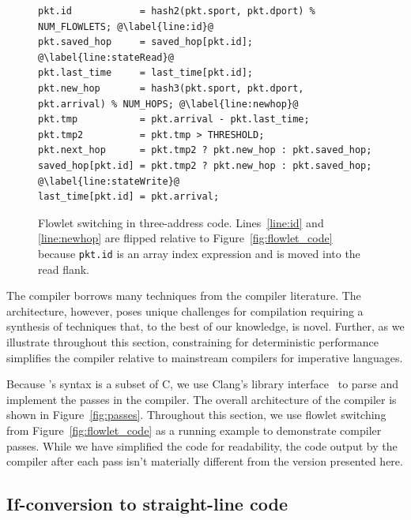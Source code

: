 \begin{figure}[!t]
\begin{minipage}{\textwidth}
\begin{lstlisting}[style=customc]
pkt.id            = hash2(pkt.sport, pkt.dport) % NUM_FLOWLETS; @\label{line:id}@
pkt.saved_hop     = saved_hop[pkt.id]; @\label{line:stateRead}@
pkt.last_time     = last_time[pkt.id];
pkt.new_hop       = hash3(pkt.sport, pkt.dport, pkt.arrival) % NUM_HOPS; @\label{line:newhop}@
pkt.tmp           = pkt.arrival - pkt.last_time;
pkt.tmp2          = pkt.tmp > THRESHOLD;
pkt.next_hop      = pkt.tmp2 ? pkt.new_hop : pkt.saved_hop;
saved_hop[pkt.id] = pkt.tmp2 ? pkt.new_hop : pkt.saved_hop; @\label{line:stateWrite}@
last_time[pkt.id] = pkt.arrival;
\end{lstlisting}
\caption[title2]{Flowlet switching in three-address
code. Lines~\ref{line:id} and \ref{line:newhop} are flipped relative
to Figure~\ref{fig:flowlet_code} because {\tt pkt.id} is an array index expression and is
moved into the read flank.}
\label{fig:three_address}
\end{minipage}
\vspace{-0.5cm}
\end{figure}

The \pktlanguage compiler borrows many techniques from the compiler literature.
The \absmachine architecture, however, poses unique challenges for compilation
requiring a synthesis of techniques that, to the best of our knowledge, is
novel. Further, as we illustrate throughout this section, constraining
\pktlanguage for deterministic performance simplifies the \pktlanguage
compiler relative to mainstream compilers for imperative languages.

Because \pktlanguage's syntax is a subset of C, we use Clang's library
interface~\cite{libclang} to parse and implement the passes in the compiler.
The overall architecture of the compiler is shown in Figure~\ref{fig:passes}.
Throughout this section, we use flowlet switching from
Figure~\ref{fig:flowlet_code} as a running example to demonstrate compiler
passes.  While we have simplified the code for readability, the code output by
the \pktlanguage compiler after each pass isn't materially different from the
version presented here.

\subsection{If-conversion to straight-line code}

